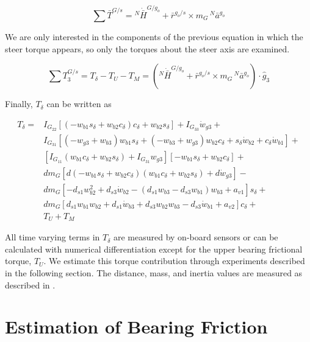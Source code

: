 \documentclass[10pt]{article}
\begin{document}
\begin{equation}
  \sum \bar{T}^{G/s} = {}^N\dot{\bar{H}}^{G/g_o} +
    \bar{r}^{g_o/s} \times m_G\,{}^N\bar{a}^{g_o}
\end{equation}

We are only interested in the components of the previous equation in which the
steer torque appears, so only the torques about the steer axis are examined.

\begin{equation}
  \sum T^{G/s}_3 = T_\delta - T_U - T_M = \left({}^N\dot{\bar{H}}^{G/g_o} +
  \bar{r}^{g_o/s} \times m_G\,{}^N\bar{a}^{g_o}\right) \cdot \hat{g}_3
\end{equation}

Finally, $T_\delta$ can be written as

\begin{align}
  T_{\delta} =
    & I_{G_{22}} \left[ \left( -w_{b1} s_\delta + w_{b2} c_\delta \right)
      c_\delta + w_{b2} s_\delta \right] + I_{G_{33}} \dot{w}_{g3} + \nonumber \\
    & I_{G_{31}} \left[ (-w_{g3} + w_{b3} ) w_{b1} s_\delta +
      (-w_{b3} + w_{g3}) w_{b2} c_\delta +
      s_\delta \dot{w}_{b2} + c_\delta \dot{w}_{b1} \right] + \nonumber \\
    & \left[ I_{G_{11}} (w_{b1} c_\delta + w_{b2}s_\delta) +
      I_{G_{31}} w_{g3} \right] \left[-w_{b1} s_\delta +
      w_{b2} c_\delta \right] + \nonumber \\
    & d m_G \left[ d (-w_{b1} s_\delta + w_{b2} c_\delta)
      (w_{b1} c_\delta + w_{b2} s_\delta) + d \dot{w}_{g3} \right] - \nonumber \\
    & d m_G \left[-d_{s1} w_{b2}^{2} + d_{s3} \dot{w}_{b2} -
      (d_{s1} w_{b3} - d_{s3} w_{b1}) w_{b3} + a_{v1} \right] s_\delta + \nonumber \\
    & d m_G \left[d_{s1} w_{b1} w_{b2} + d_{s1} \dot{w}_{b3} +
      d_{s3} w_{b2} w_{b3} - d_{s3} \dot{w}_{b1} + a_{v2} \right]
      c_\delta + \nonumber \\
    & T_U + T_M
\end{align}

All time varying terms in $T_\delta$ are measured by on-board sensors or can be
calculated with numerical differentiation except for the upper bearing
frictional torque, $T_U$. We estimate this torque contribution through
experiments described in the following section. The distance, mass, and inertia
values are measured as described in \cite{Moore2012}.

\section*{Estimation of Bearing Friction}
\label{sec:bearing-friction}
\end{document}
